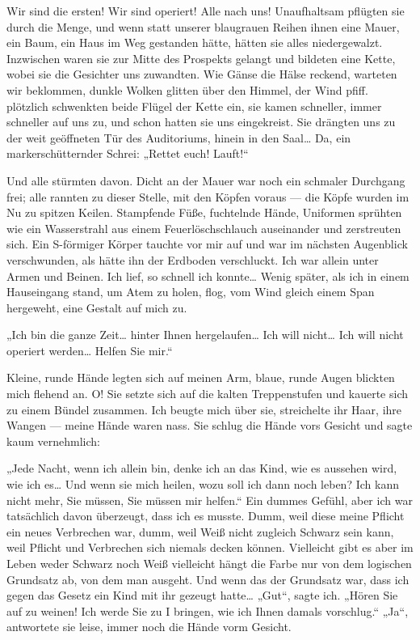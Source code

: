 Wir sind die ersten! Wir sind operiert! Alle nach uns! Unaufhaltsam
pflügten sie durch die Menge, und wenn statt unserer blaugrauen
Reihen ihnen eine Mauer, ein Baum, ein Haus im Weg gestanden hätte,
hätten sie alles niedergewalzt. Inzwischen waren sie zur Mitte des
Prospekts gelangt und bildeten eine Kette, wobei sie die Gesichter
uns zuwandten. Wie Gänse die Hälse reckend, warteten wir beklommen,
dunkle Wolken glitten über den Himmel, der Wind pfiff.
plötzlich schwenkten beide Flügel der Kette ein, sie kamen
schneller, immer schneller auf uns zu, und schon hatten sie uns
eingekreist. Sie drängten uns zu der weit geöffneten Tür des
Auditoriums, hinein in den Saal\ldots{} Da, ein markerschütternder
Schrei: „Rettet euch! Lauft!“

Und alle stürmten davon. Dicht an der Mauer war noch ein schmaler
Durchgang frei; alle rannten zu dieser Stelle, mit den Köpfen
voraus — die Köpfe wurden im Nu zu spitzen Keilen. Stampfende Füße,
fuchtelnde Hände, Uniformen sprühten wie ein Wasserstrahl aus einem
Feuerlöschschlauch auseinander und zerstreuten sich. Ein S-förmiger
Körper tauchte vor mir auf und war im nächsten Augenblick
verschwunden, als hätte ihn der Erdboden verschluckt. Ich war
allein unter Armen und Beinen. Ich lief, so schnell ich konnte\ldots{}
Wenig später, als ich in einem Hauseingang stand, um Atem zu holen,
flog, vom Wind gleich einem Span hergeweht, eine Gestalt auf mich
zu.

„Ich bin die ganze Zeit\ldots{} hinter Ihnen hergelaufen\ldots{} Ich will
nicht\ldots{} Ich will nicht operiert werden\ldots{} Helfen Sie mir.“

Kleine, runde Hände legten sich auf meinen Arm, blaue, runde Augen
blickten mich flehend an. O! Sie setzte sich auf die kalten
Treppenstufen und kauerte sich zu einem Bündel zusammen. Ich beugte
mich über sie, streichelte ihr Haar, ihre Wangen — meine Hände
waren nass. Sie schlug die Hände vors Gesicht und sagte kaum
vernehmlich:

„Jede Nacht, wenn ich allein bin, denke ich an das Kind, wie es
aussehen wird, wie ich es\ldots{} Und wenn sie mich heilen, wozu soll
ich dann noch leben? Ich kann nicht mehr, Sie müssen, Sie müssen
mir helfen.“ Ein dummes Gefühl, aber ich war tatsächlich davon
überzeugt, dass ich es musste. Dumm, weil diese meine Pflicht ein
neues Verbrechen war, dumm, weil Weiß nicht zugleich Schwarz sein
kann, weil Pflicht und Verbrechen sich niemals decken können.
Vielleicht gibt es aber im Leben weder Schwarz noch Weiß vielleicht
hängt die Farbe nur von dem logischen Grundsatz ab, von dem man
ausgeht. Und wenn das der Grundsatz war, dass ich gegen das Gesetz
ein Kind mit ihr gezeugt hatte\ldots{} „Gut“, sagte ich. „Hören Sie auf
zu weinen! Ich werde Sie zu I bringen, wie ich Ihnen damals
vorschlug.“ „Ja“, antwortete sie leise, immer noch die Hände vorm
Gesicht.

